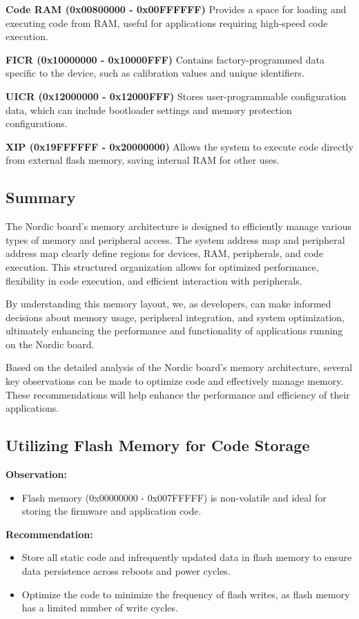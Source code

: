 \documentclass{Configuration_Files/PoliMi3i_thesis}
\begin{document}
\textbf{Code RAM (0x00800000 - 0x00FFFFFF)}
Provides a space for loading and executing code from RAM, useful for applications requiring high-speed code execution.

\textbf{FICR (0x10000000 - 0x10000FFF)}
Contains factory-programmed data specific to the device, such as calibration values and unique identifiers.

\textbf{UICR (0x12000000 - 0x12000FFF)}
Stores user-programmable configuration data, which can include bootloader settings and memory protection configurations.

\textbf{XIP (0x19FFFFFF - 0x20000000)}
Allows the system to execute code directly from external flash memory, saving internal RAM for other uses.

\subsection{Summary}
The Nordic board's memory architecture is designed to efficiently manage various types of memory and peripheral access. The system address map and peripheral address map clearly define regions for devices, RAM, peripherals, and code execution. This structured organization allows for optimized performance, flexibility in code execution, and efficient interaction with peripherals.

By understanding this memory layout, we, as developers, can make informed decisions about memory usage, peripheral integration, and system optimization, ultimately enhancing the performance and functionality of applications running on the Nordic board.

Based on the detailed analysis of the Nordic board's memory architecture, several key observations can be made to optimize code and effectively manage memory. These recommendations will help enhance the performance and efficiency of their applications.

\subsection{Utilizing Flash Memory for Code Storage}
\textbf{Observation:}
\begin{itemize}
    \item Flash memory (0x00000000 - 0x007FFFFF) is non-volatile and ideal for storing the firmware and application code.
\end{itemize}

\textbf{Recommendation:}
\begin{itemize}
    \item Store all static code and infrequently updated data in flash memory to ensure data persistence across reboots and power cycles.
    \item Optimize the code to minimize the frequency of flash writes, as flash memory has a limited number of write cycles.
\end{itemize}
\end{document}
